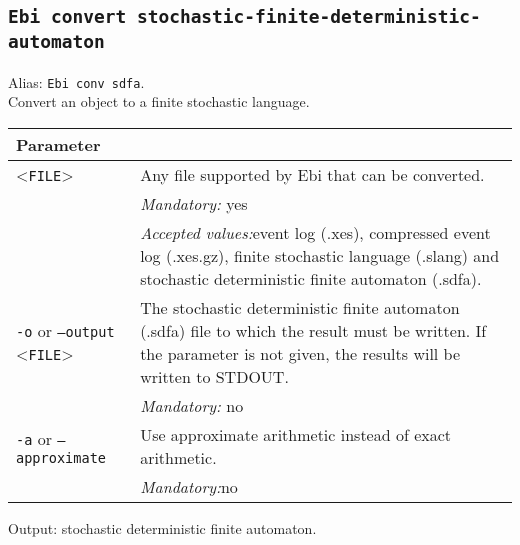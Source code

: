 {\subsection{\texttt{Ebi convert stochastic-finite-deterministic-automaton}}
Alias: \texttt{Ebi conv sdfa}.\\
Convert an object to a finite stochastic language.\\
\begin{tabularx}{\linewidth}{lX}
\toprule
Parameter \\\midrule
<\texttt{FILE}>&Any file supported by Ebi that can be converted.\\
&\textit{Mandatory:} \quad yes\\
&\textit{Accepted values:}\quad event log (.xes), compressed event log (.xes.gz), finite stochastic language (.slang) and stochastic deterministic finite automaton (.sdfa).\\
\texttt{-o} or \texttt{--output} <\texttt{FILE}> &
The stochastic deterministic finite automaton (.sdfa) file to which the result must be written. If the parameter is not given, the results will be written to STDOUT.\\
&\textit{Mandatory:} \quad no\\
\texttt{-a} or \texttt{--approximate} & Use approximate arithmetic instead of exact arithmetic.\\
&\textit{Mandatory:}\quad no\\
\bottomrule
\end{tabularx}
Output: stochastic deterministic finite automaton.
}
